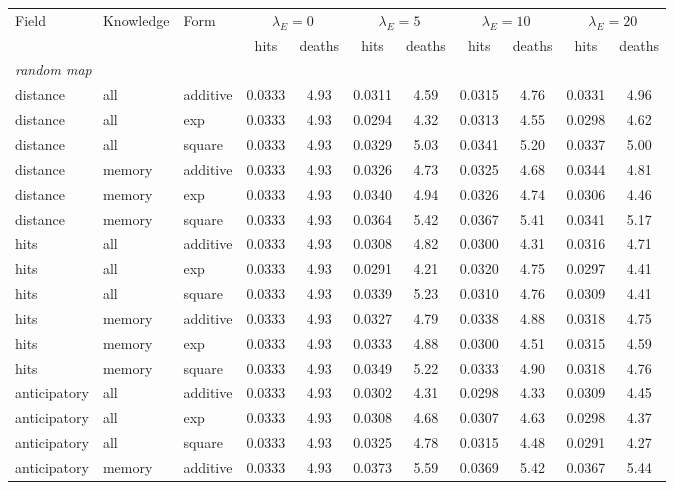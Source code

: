 \begin{tabular}{lllcccccccc}
\toprule
Field & Knowledge & Form & \multicolumn{2}{c}{$\lambda_E=0$} & \multicolumn{2}{c}{$\lambda_E=5$} & \multicolumn{2}{c}{$\lambda_E=10$} & \multicolumn{2}{c}{$\lambda_E=20$} \\
 & & & hits & deaths & hits & deaths & hits & deaths & hits & deaths \\
\midrule
\multicolumn{11}{l}{\emph{random map}} \\
distance & all & additive & 0.0333 & 4.93 & 0.0311 & 4.59 & 0.0315 & 4.76 & 0.0331 & 4.96 \\
distance & all & exp & 0.0333 & 4.93 & 0.0294 & 4.32 & 0.0313 & 4.55 & 0.0298 & 4.62 \\
distance & all & square & 0.0333 & 4.93 & 0.0329 & 5.03 & 0.0341 & 5.20 & 0.0337 & 5.00 \\
distance & memory & additive & 0.0333 & 4.93 & 0.0326 & 4.73 & 0.0325 & 4.68 & 0.0344 & 4.81 \\
distance & memory & exp & 0.0333 & 4.93 & 0.0340 & 4.94 & 0.0326 & 4.74 & 0.0306 & 4.46 \\
distance & memory & square & 0.0333 & 4.93 & 0.0364 & 5.42 & 0.0367 & 5.41 & 0.0341 & 5.17 \\
hits & all & additive & 0.0333 & 4.93 & 0.0308 & 4.82 & 0.0300 & 4.31 & 0.0316 & 4.71 \\
hits & all & exp & 0.0333 & 4.93 & 0.0291 & 4.21 & 0.0320 & 4.75 & 0.0297 & 4.41 \\
hits & all & square & 0.0333 & 4.93 & 0.0339 & 5.23 & 0.0310 & 4.76 & 0.0309 & 4.41 \\
hits & memory & additive & 0.0333 & 4.93 & 0.0327 & 4.79 & 0.0338 & 4.88 & 0.0318 & 4.75 \\
hits & memory & exp & 0.0333 & 4.93 & 0.0333 & 4.88 & 0.0300 & 4.51 & 0.0315 & 4.59 \\
hits & memory & square & 0.0333 & 4.93 & 0.0349 & 5.22 & 0.0333 & 4.90 & 0.0318 & 4.76 \\
anticipatory & all & additive & 0.0333 & 4.93 & 0.0302 & 4.31 & 0.0298 & 4.33 & 0.0309 & 4.45 \\
anticipatory & all & exp & 0.0333 & 4.93 & 0.0308 & 4.68 & 0.0307 & 4.63 & 0.0298 & 4.37 \\
anticipatory & all & square & 0.0333 & 4.93 & 0.0325 & 4.78 & 0.0315 & 4.48 & 0.0291 & 4.27 \\
anticipatory & memory & additive & 0.0333 & 4.93 & 0.0373 & 5.59 & 0.0369 & 5.42 & 0.0367 & 5.44 \\

\end{tabular}
